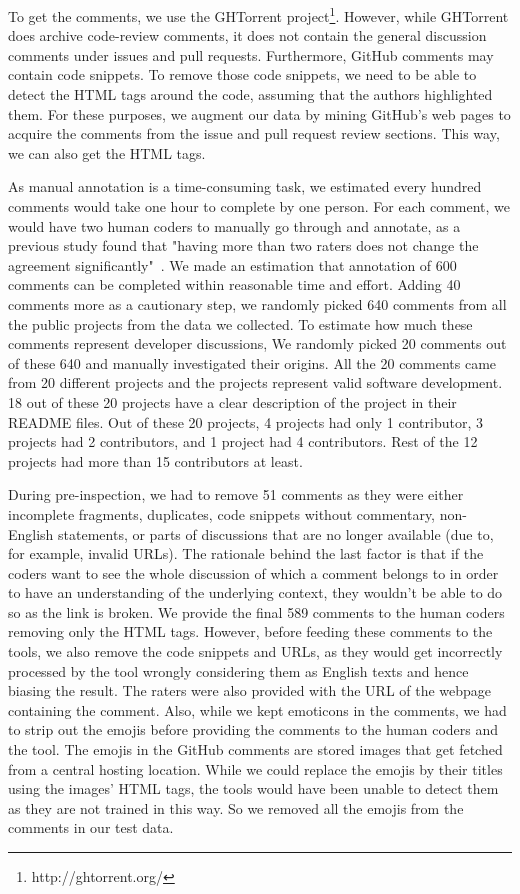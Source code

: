To get the comments, 
we use the GHTorrent project\footnote{http://ghtorrent.org/}. However, while GHTorrent does archive code-review comments, 
it does not contain the general discussion comments 
under issues and pull requests. 
Furthermore, 
GitHub comments may contain code snippets.
To remove those code snippets, 
we need to be able to detect the HTML tags around the code, 
assuming that the authors highlighted them. 
For these purposes, 
we augment our data by mining GitHub's web pages 
to acquire the comments from the issue and pull request review sections. 
This way, we can also get the HTML tags.

As manual annotation is a time-consuming task, 
we estimated 
every hundred comments 
would take one hour to complete by one person. 
For each comment, 
we would have two human coders to 
manually go through and annotate, 
as a previous study found that 
"having more than two raters 
does not change 
the agreement significantly"~\cite{murgia2014developers}. 
We made an estimation that annotation of 600 comments 
can be completed within reasonable time and effort.
Adding 40 comments more as a cautionary step, 
we randomly picked 640 comments 
from all the public projects from the data we collected.
To estimate how much these comments
represent developer discussions,
We randomly picked 
20 comments out of these 640 
and manually investigated their origins.
All the 20 comments came from 20 different projects 
and the projects represent valid software development.
18 out of these 20 projects have a clear description 
of the project in their README files.
Out of these 20 projects, 
4 projects had only 1 contributor, 
3 projects had 2 contributors, 
and 1 project had 4 contributors.
Rest of the 12 projects had more than 15 contributors at least.

During pre-inspection, 
we had to remove 51 comments as they were 
either incomplete fragments, 
duplicates, 
code snippets without commentary, 
non-English statements, 
or parts of discussions that are no longer available 
(due to, for example, invalid URLs). 
The rationale behind the last factor is that 
if the coders want to see the whole discussion 
of which a comment belongs to
in order to have an understanding 
of the underlying context, 
they wouldn't be able to do so as the link is broken. 
We provide the final 589 comments to the human coders 
removing only the HTML tags. 
However, before feeding these comments to the tools, 
we also remove the code snippets and URLs, 
as they would get incorrectly processed by the tool 
wrongly considering them as English texts 
and hence biasing the result. 
The raters were also provided with the URL of the webpage 
containing the comment.
Also, while we kept emoticons in the comments, 
we had to strip out the emojis 
before providing the comments 
to the human coders and the tool.
The emojis in the GitHub comments 
are stored images 
that get fetched from a central hosting location.
While we could replace the emojis 
by their titles using the images' HTML tags, 
the tools would have been unable to detect them 
as they are not trained in this way.
So we removed all the emojis 
from the comments in our test data.

